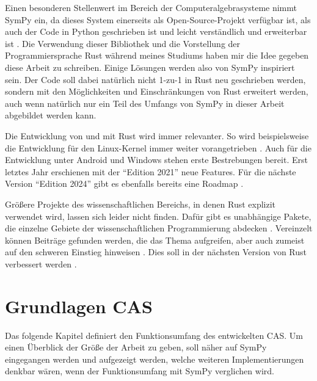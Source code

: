 \documentclass[11pt,a4paper, ngerman]{article}
\begin{document}
Einen besonderen Stellenwert im Bereich der Computeralgebrasysteme nimmt SymPy ein, da dieses System einerseits als Open-Source-Projekt verfügbar ist, als auch der Code in Python geschrieben ist und leicht verständlich und erweiterbar ist \cite[S. 1]{SympyPeerJ}. Die Verwendung dieser Bibliothek und die Vorstellung der Programmiersprache Rust während meines Studiums haben mir die Idee gegeben diese Arbeit zu schreiben. Einige Lösungen werden also von SymPy inspiriert sein. Der Code soll dabei natürlich nicht 1-zu-1 in Rust neu geschrieben werden, sondern mit den Möglichkeiten und Einschränkungen von Rust erweitert werden, auch wenn natürlich nur ein Teil des Umfangs von SymPy in dieser Arbeit abgebildet werden kann.

Die Entwicklung von und mit Rust wird immer relevanter. So wird beispielsweise die Entwicklung für den Linux-Kernel immer weiter vorangetrieben \cite{RustLinux}. Auch für die Entwicklung unter Android \cite{GoogleExample} und Windows \cite{WindowsRust} stehen erste Bestrebungen bereit. Erst letztes Jahr erschienen mit der ``Edition 2021'' \cite{RustEditon2021} neue Features. Für die nächste Version ``Edition 2024'' gibt es ebenfalls bereits eine Roadmap \cite{RustEditon2024}.

Größere Projekte des wissenschaftlichen Bereichs, in denen Rust explizit verwendet wird, lassen sich leider nicht finden. Dafür gibt es unabhängige Pakete, die einzelne Gebiete der wissenschaftlichen Programmierung abdecken \cite{RustEx1} \cite{RustEx2} \cite{RustEx3}. Vereinzelt können Beiträge gefunden werden, die das Thema aufgreifen, aber auch zumeist auf den schweren Einstieg hinweisen \cite{RustUse1} \cite{RustUse2} \cite{RustUse3}. Dies soll in der nächsten Version von Rust verbessert werden \cite{RustEditon2024Specific}.

\newpage

\section{Grundlagen CAS}
Das folgende Kapitel definiert den Funktionsumfang des entwickelten CAS. Um einen Überblick der Größe der Arbeit zu geben, soll näher auf SymPy eingegangen werden und aufgezeigt werden, welche weiteren Implementierungen denkbar wären, wenn der Funktionsumfang mit SymPy verglichen wird.
\end{document}

